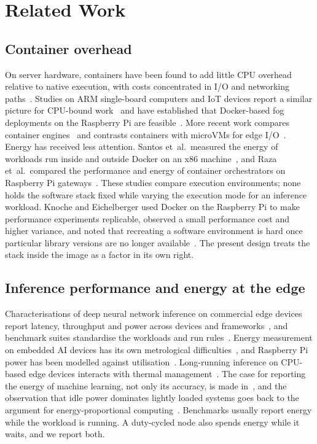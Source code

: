 \documentclass[10pt,journal,compsoc]{IEEEtran}
\begin{document}
\section{Related Work}\label{sec:related}

\subsection{Container overhead}
On server hardware, containers have been found to add little CPU overhead relative to native execution, with costs concentrated in I/O and networking paths~\cite{felter2015updated,morabito2015hypervisors}. Studies on ARM single-board computers and IoT devices report a similar picture for CPU-bound work~\cite{morabito2016performance,morabito2017virtualization,ramalho2016virtualization} and have established that Docker-based fog deployments on the Raspberry Pi are feasible~\cite{bellavista2017feasibility}. More recent work compares container engines~\cite{baresi2024qualitative} and contrasts containers with microVMs for edge I/O~\cite{lee2026performance}. Energy has received less attention. Santos et~al.\ measured the energy of workloads run inside and outside Docker on an x86 machine~\cite{santos2018docker}, and Raza et~al.\ compared the performance and energy of container orchestrators on Raspberry Pi gateways~\cite{raza2021empirical}. These studies compare execution environments; none holds the software stack fixed while varying the execution mode for an inference workload. Knoche and Eichelberger used Docker on the Raspberry Pi to make performance experiments replicable, observed a small performance cost and higher variance, and noted that recreating a software environment is hard once particular library versions are no longer available~\cite{knoche2018using}. The present design treats the stack inside the image as a factor in its own right.

\subsection{Inference performance and energy at the edge}
Characterisations of deep neural network inference on commercial edge devices report latency, throughput and power across devices and frameworks~\cite{hadidi2019characterizing,liang2020ai,baller2021deepedgebench}, and benchmark suites standardise the workloads and run rules~\cite{reddi2020mlperf,banbury2021mlperftiny}. Energy measurement on embedded AI devices has its own metrological difficulties~\cite{apicella2026energy}, and Raspberry Pi power has been modelled against utilisation~\cite{kaup2014powerpi}. Long-running inference on CPU-based edge devices interacts with thermal management~\cite{benoitcattin2020impact}. The case for reporting the energy of machine learning, not only its accuracy, is made in~\cite{schwartz2020green,strubell2019energy,henderson2020towards}, and the observation that idle power dominates lightly loaded systems goes back to the argument for energy-proportional computing~\cite{barroso2007case}. Benchmarks usually report energy while the workload is running. A duty-cycled node also spends energy while it waits, and we report both.
\end{document}
